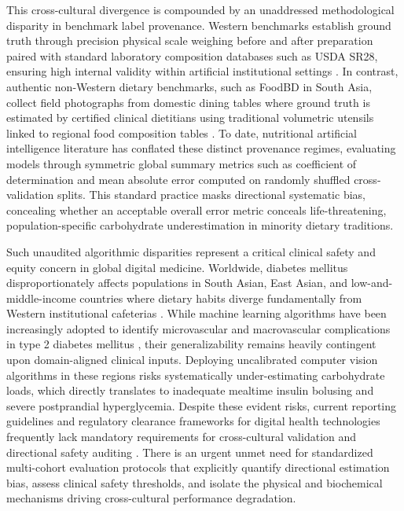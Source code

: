 \documentclass[utf8]{FrontiersinVancouver}
\begin{document}
This cross-cultural divergence is compounded by an unaddressed methodological disparity in benchmark label provenance. Western benchmarks establish ground truth through precision physical scale weighing before and after preparation paired with standard laboratory composition databases such as USDA SR28, ensuring high internal validity within artificial institutional settings \citep{Thames2021Nutrition5k}. In contrast, authentic non-Western dietary benchmarks, such as FoodBD in South Asia, collect field photographs from domestic dining tables where ground truth is estimated by certified clinical dietitians using traditional volumetric utensils linked to regional food composition tables \citep{Ahmed2025FoodBD,Shaheen2013BangladeshFCT}. To date, nutritional artificial intelligence literature has conflated these distinct provenance regimes, evaluating models through symmetric global summary metrics such as coefficient of determination and mean absolute error computed on randomly shuffled cross-validation splits. This standard practice masks directional systematic bias, concealing whether an acceptable overall error metric conceals life-threatening, population-specific carbohydrate underestimation in minority dietary traditions.

Such unaudited algorithmic disparities represent a critical clinical safety and equity concern in global digital medicine. Worldwide, diabetes mellitus disproportionately affects populations in South Asian, East Asian, and low-and-middle-income countries where dietary habits diverge fundamentally from Western institutional cafeterias \citep{WHO2024DiabetesGlobal}. While machine learning algorithms have been increasingly adopted to identify microvascular and macrovascular complications in type 2 diabetes mellitus \citep{Zhang2025MLDiabetes}, their generalizability remains heavily contingent upon domain-aligned clinical inputs. Deploying uncalibrated computer vision algorithms in these regions risks systematically under-estimating carbohydrate loads, which directly translates to inadequate mealtime insulin bolusing and severe postprandial hyperglycemia. Despite these evident risks, current reporting guidelines and regulatory clearance frameworks for digital health technologies frequently lack mandatory requirements for cross-cultural validation and directional safety auditing \citep{Collins2021TRIPODAI}. There is an urgent unmet need for standardized multi-cohort evaluation protocols that explicitly quantify directional estimation bias, assess clinical safety thresholds, and isolate the physical and biochemical mechanisms driving cross-cultural performance degradation.
\end{document}
